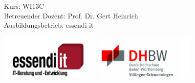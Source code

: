 \begin{titlepage}

\maketitle
\thispagestyle{empty}

\begin{centering}
Kurs: WI13C\\
Betreuender Dozent: Prof. Dr. Gert Heinrich\\
Ausbildungsbetrieb: essendi it \\
\end{centering}
\vspace{4cm}


\includegraphics[width=5cm]{images/essendi-logo.png}
\hfill
\includegraphics[width=5cm]{images/dhbw-logo.png}

\vfill

\end{titlepage}